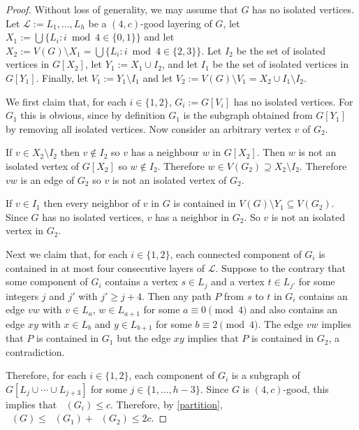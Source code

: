 \documentclass{patmorin}
\DeclareMathOperator{\odd}{\chi_o}
\begin{document}
\begin{proof}
  Without loss of generality, we may assume that $G$ has no isolated vertices.
  Let $\mathcal{L}:=L_1,\ldots,L_h$ be a $(4,c)$-good layering of $G$,
  let $X_1:=\bigcup\{L_i:i\bmod 4\in\{0,1\}\}$ and let $X_2:=V(G)\setminus X_1=\bigcup\{L_i:i\bmod 4\in\{2,3\}\}$.  Let $I_2$ be the set of isolated vertices in $G[X_2]$, let $Y_1:=X_1\cup I_2$, and let $I_1$ be the set of isolated vertices in $G[Y_1]$.  Finally, let $V_1:=Y_1\setminus I_1$ and let $V_2:=V(G)\setminus V_1=X_2\cup I_1\setminus I_2$.

  We first claim that, for each $i\in\{1,2\}$, $G_i:=G[V_i]$ has no isolated vertices. For $G_1$ this is obvious, since by definition $G_1$ is the subgraph obtained from $G[Y_1]$ by removing all isolated vertices.  Now consider an arbitrary vertex $v$ of $G_2$.
  \begin{compactenum}
    \item If $v\in X_2\setminus I_2$ then $v\not\in I_2$ so $v$ has a neighbour $w$ in $G[X_2]$.  Then $w$ is not an isolated vertex of $G[X_2]$ so $w\not\in I_2$.  Therefore $w\in V(G_2)\supseteq X_2\setminus I_2$. Therefore $vw$ is an edge of $G_2$ so $v$ is not an isolated vertex of $G_2$.
    \item If $v \in I_1$ then every neighbor of $v$ in $G$ is contained in $V(G) \setminus Y_1 \subseteq V(G_2)$. Since $G$ has no isolated vertices, $v$ has a neighbor in $G_2$. So $v$ is not an isolated vertex in $G_2$.
  \end{compactenum}
  Next we claim that, for each $i\in\{1,2\}$, each connected component of $G_i$ is contained in at most four consecutive layers of $\mathcal{L}$.  Suppose to the contrary that some component of $G_i$ contains a vertex $s\in L_j$ and a vertex $t\in L_{j'}$ for some integers $j$ and $j'$ with $j'\ge j+4$.  Then any path $P$ from $s$ to $t$ in $G_i$ contains an edge $vw$ with $v\in L_a$, $w\in L_{a+1}$ for some $a\equiv 0\pmod 4$ and also contains an edge $xy$ with $x\in L_b$ and $y\in L_{b+1}$ for some $b\equiv 2\pmod 4$.  The edge $vw$ implies that $P$ is contained in $G_1$ but the edge $xy$ implies that $P$ is contained in $G_2$, a contradiction.

  Therefore, for each $i\in\{1,2\}$, each component of $G_i$ is a subgraph of $G[L_j\cup\cdots\cup L_{j+3}]$ for some $j\in\{1,\ldots,h-3\}$.  Since $G$ is $(4,c)$-good, this implies that $\odd(G_i)\le c$.  Therefore, by \cref{partition}, $\odd(G)\le \odd(G_1)+\odd(G_2)\le 2c$.
\end{proof}
\end{document}
